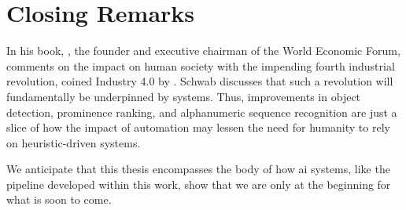 

\section{Closing Remarks}

In his \citeyear{Schwab:2017vd} book, \citet{Schwab:2017vd}, the founder and executive chairman of the World Economic Forum, comments on the impact on human society with the impending fourth industrial revolution, coined Industry 4.0 by \citet{kagermann2011industrie}. Schwab discusses that such a revolution will fundamentally be underpinned by  systems. Thus, improvements in object detection, prominence ranking, and alphanumeric sequence recognition are just a slice of how the impact of automation may lessen the need for humanity to rely on heuristic-driven systems.

\bigskip
\noindent
We anticipate that this thesis encompasses the body of how \gls{ai} systems, like the pipeline developed within this work, show that we are only at the beginning for what is soon to come.